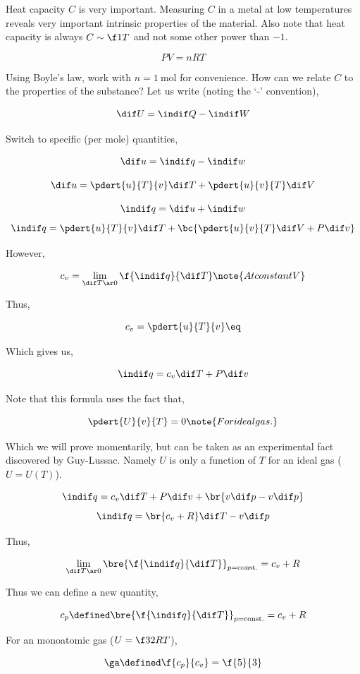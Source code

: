 \documentclass{article}
\begin{document}
Heat capacity $C$ is very important. Measuring $C$ in a metal at low temperatures reveals very important intrinsic properties of the material. Also note that heat capacity is always $C \sim \f1T$ and not some other power than $-1$.


\[ PV = nRT \]

Using Boyle's law, work with $n = \SI{1}{\mole}$ for convenience. How can we relate $C$ to the properties of the substance? Let us write (noting the `-' convention),

\[ \dif U = \indif Q - \indif W \]

Switch to specific (per mole) quantities,

\[ \dif u = \indif q - \indif w \]

\[ \dif u = \pdert{u}{T}{v} \dif T + \pdert{u}{v}{T} \dif V \]

\[ \indif q = \dif u + \indif w \]
\[ \indif q = \pdert{u}{T}{v} \dif T + \bc{\pdert{u}{v}{T} \dif V + P\dif v} \]

However,

\[ c_v = \lim_{\dif T \ar 0} \f{\indif q}{\dif T} \note{At constant V} \]

Thus,

\[ c_v = \pdert{u}{T}{v} \eq \label{eq:heatcapacity} \]

Which gives us,

\[ \indif q = c_v \dif T  + P\dif v \]

Note that this formula uses the fact that,

\[ \pdert{U}{v}{T} = 0 \note{For ideal gas.} \]

Which we will prove momentarily, but can be taken as an experimental fact discovered by Guy-Lussac. Namely $U$ is only a function of $T$ for an ideal gas ($U = U(T)$).

\[ \indif q = c_v \dif T  + P\dif v + \br{ v \dif p  - v\dif p} \]
\[ \indif q = \br{c_v + R} \dif T  - v\dif p \]

Thus,

\[ \lim_{\dif T \ar 0} \bre{\f{\indif q}{\dif T}}_{p=\text{const.}} = c_v + R \]

Thus we can define a new quantity,

\[ c_p \defined \bre{\f{\indif q}{\dif T}}_{p=\text{const.}} = c_v + R \]

For an monoatomic gas ($U = \f32 RT$),

\[ \ga \defined \f{c_p}{c_v} = \f{5}{3} \]
\end{document}
